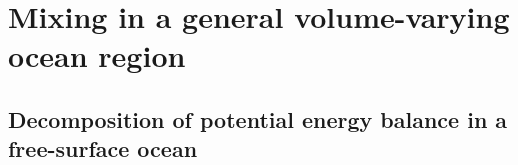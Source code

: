 
\section{Mixing in a general volume-varying ocean region}
\label{section_mix_vol}
\subsection{Decomposition of potential energy balance in a free-surface ocean}
\label{section_PE_chap2}









